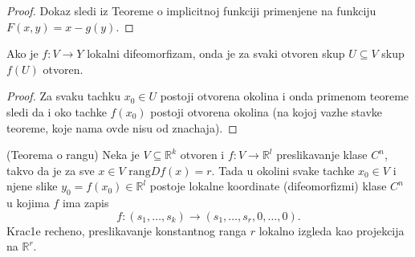 \documentclass[a4paper,12pt]{article}
\newcommand{\R}{\mathbb{R}}
\newcommand{\psj}{\subseteq}
\newcommand{\rang}{\mathrm{rang}}
\begin{document}
\begin{proof}
Dokaz sledi iz Teoreme o implicitnoj funkciji primenjene na funkciju $F(x,y) = x - g(y)$.
\end{proof}

\begin{posl}
	Ako je $f:V\to Y$ lokalni difeomorfizam, onda je za svaki otvoren skup $U\psj V$ skup $f(U)$ otvoren.
\end{posl}
\begin{proof}
	Za svaku tachku $x_0 \in U$ postoji otvorena okolina i onda primenom teoreme sledi da i oko tachke
	$f(x_0)$ postoji otvorena okolina (na kojoj vazhe stavke teoreme, koje nama ovde nisu od znachaja).
\end{proof}

\begin{tma}(Teorema o rangu) Neka je $V \subseteq \R^k$ otvoren i $f: V \to \R^l$ preslikavanje klase $C^n$, takvo da je za sve $x \in V$ $\rang Df(x) = r$. Tada u okolini svake tachke $x_0 \in V$ i njene slike $y_0 = f(x_0) \in \R^l$ postoje lokalne koordinate (difeomorfizmi) klase $C^n$ u kojima $f$ ima zapis \[f: (s_1, \dots , s_k) \to (s_1, \dots, s_r, 0, \dots , 0).\]
Krac1e recheno, preslikavanje konstantnog ranga $r$ lokalno izgleda kao projekcija na $\R^r$.
\end{tma}
\end{document}
